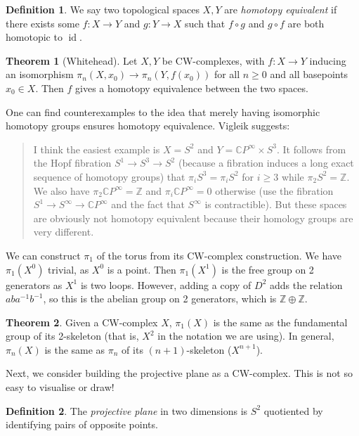 \documentclass[a4paper,12pt]{article}
\newcommand{\ZZ}{\mathbb{Z}}
\newcommand{\CC}{\mathbb{C}}
\newcommand{\of}{\circ}
\theoremstyle{definition}
\newtheorem*{thm}{Theorem}
\newtheorem*{defn}{Definition}
\begin{document}
\begin{defn}
	We say two topological spaces $X, Y$ are \emph{homotopy equivalent} if there exists some $f: X\to Y$ and $g: Y\to X$ such that $f\of g$ and $g\of f$ are both homotopic to $\operatorname{id}$.
\end{defn}

\begin{thm}[Whitehead]
	Let $X, Y$ be CW-complexes, with $f: X\to Y$ inducing an isomorphism $\pi_n(X, x_0) \to \pi_n(Y, f(x_0))$ for all $n \geq 0$ and all basepoints $x_0 \in X$.
	Then $f$ gives a homotopy equivalence between the two spaces.
\end{thm}

One can find counterexamples to the idea that merely having isomorphic homotopy groups ensures homotopy equivalence. Vigleik suggests:
\begin{quote}
I think the easiest example is $X = S^2$ and $Y = \CC P^\infty \times S^3$. It follows from the Hopf fibration $S^1 \to S^3 \to S^2$ (because a fibration induces a long exact sequence of homotopy groups) that $\pi_i S^3 = \pi_i S^2$ for $i \geq 3$ while $\pi_2 S^2 = \ZZ$. We also have $\pi_2 \CC P^\infty = \ZZ$ and $\pi_i \CC P^\infty = 0$ otherwise (use the fibration $S^1 \to S^\infty \to \CC P^\infty$ and the fact that $S^\infty$ is contractible). But these spaces are obviously not homotopy equivalent because their homology groups are very different.
\end{quote}


We can construct $\pi_1$ of the torus from its CW-complex construction.
We have $\pi_1(X^0)$ trivial, as $X^0$ is a point.
Then $\pi_1(X^1)$ is the free group on 2 generators as $X^1$ is two loops.
However, adding a copy of $D^2$ adds the relation $aba^{-1}b^{-1}$, so this is the abelian group on 2 generators, which is $\ZZ\oplus\ZZ$. 

\begin{thm}
	Given a CW-complex $X$, $\pi_1(X)$ is the same as the fundamental group of its 2-skeleton (that is, $X^2$ in the notation we are using).
	In general, $\pi_n(X)$ is the same as $\pi_n$ of its $(n+1)$-skeleton ($X^{n+1}$).
\end{thm}

Next, we consider building the projective plane as a CW-complex.
This is not so easy to visualise or draw!

\begin{defn}
The \emph{projective plane} in two dimensions is $S^2$ quotiented by identifying pairs of opposite points.
\end{defn}
\end{document}
